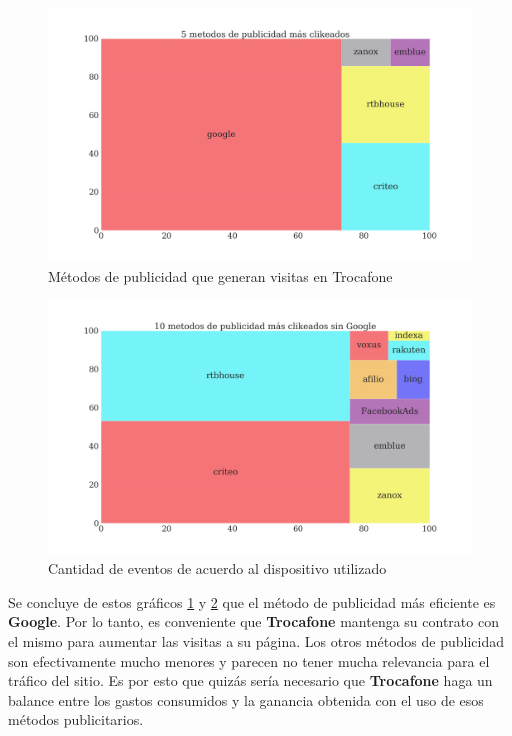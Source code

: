 \documentclass[a4paper]{article}
\begin{document}
\begin{figure}[!h]
	\includegraphics[width=\linewidth]{figures/170-publicidad_clickeada-barplot.png}
	\caption{Métodos de publicidad que generan visitas en Trocafone}
	\label{fig:metodopublicidad}
\end{figure}

\begin{figure}[!h]
	\includegraphics[width=\linewidth]{figures/171-publicidad_sin_google-barplot.png}
	\caption{Cantidad de eventos de acuerdo al dispositivo utilizado}
	\label{fig:metodopublicidadsingoogle}
\end{figure}

Se concluye de estos gráficos \ref{fig:metodopublicidad} y \ref{fig:metodopublicidadsingoogle} que el método de publicidad más eficiente es \textbf{Google}. Por lo tanto, es conveniente que \textbf{Trocafone} mantenga su contrato con el mismo para aumentar las visitas a su página. Los otros métodos de publicidad son efectivamente mucho menores y parecen no tener mucha relevancia para el tráfico del sitio. Es por esto que quizás sería necesario que \textbf{Trocafone} haga un balance entre los gastos consumidos y la ganancia obtenida con el uso de esos métodos publicitarios.
\end{document}
